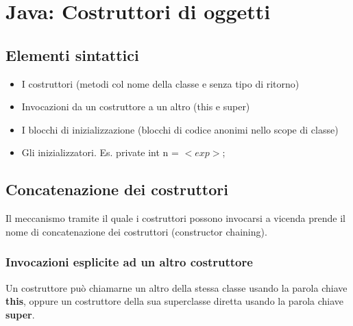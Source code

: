 \documentclass[10pt]{article}
\begin{document}
\section{Java: Costruttori di oggetti}
\subsection{Elementi sintattici}
\begin{itemize}
    \item I costruttori (metodi col nome della classe e senza tipo di ritorno)
    \item Invocazioni da un costruttore a un altro (this e super)
    \item I blocchi di inizializzazione (blocchi di codice anonimi nello scope di classe)
    \item Gli inizializzatori. Es. private int n = $<exp>$;
\end{itemize}
\subsection{Concatenazione dei costruttori}
Il meccanismo tramite il quale i costruttori possono invocarsi a vicenda prende il nome di 
concatenazione dei costruttori (constructor chaining).
\subsubsection{Invocazioni esplicite ad un altro costruttore}
Un costruttore può chiamarne un altro della stessa classe usando la parola chiave \textbf{this}, oppure un costruttore 
della sua superclasse diretta usando la parola chiave \textbf{super}.
\end{document}
